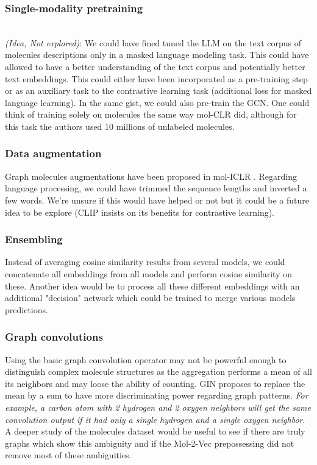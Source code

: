 \subsubsection{Single-modality pretraining}\hfill\\
\textit{(Idea, Not explored)}: We could have fined tuned the LLM on the text corpus of molecules descriptions only in a masked language modeling task. This could have allowed to have a better understanding of the text corpus and potentially better text embeddings. This could either have been incorporated as a pre-training step or as an auxiliary task to the contrastive learning task (additional loss for masked language learning).
In the same gist, we could also pre-train the GCN. One could think of training solely on molecules the same way mol-CLR \cite{molCLR} did, although for this task the authors used 10 millions of unlabeled molecules.

\subsubsection{Data augmentation}
Graph molecules augmentations have been proposed in mol-ICLR \cite{molCLR}. Regarding language processing, we could have trimmed the sequence lengths and inverted a few words. We're unsure if this would have helped or not but it could be a future idea to be explore (CLIP \cite{CLIP} insists on its benefits for contrastive learning).


\subsubsection{Ensembling}
Instead of averaging cosine similarity results from several models, we could concatenate all embeddings from all models and perform cosine similarity on these. Another idea would be to process all these different embeddings with an additional "decision" network which could be trained to merge various models predictions.

\subsubsection{Graph convolutions}
Using the basic graph convolution operator \cite{kipfwellinggcn} may not be powerful enough to distinguish complex molecule structures as the aggregation performs a mean of all its neighbors and may loose the ability of counting. GIN \cite{gin_isomorphism} proposes to replace the mean by a sum to have more discriminating power regarding graph patterns. \textit{For example, a carbon atom with 2 hydrogen and 2 oxygen neighbors will get the same convolution output if it had only a single hydrogen and a single oxygen neighbor}. A deeper study of the molecules dataset would be useful to see if there are truly graphs which show this ambiguity and if the Mol-2-Vec \cite{mol2vec} prepossessing did not remove most of these ambiguities.
